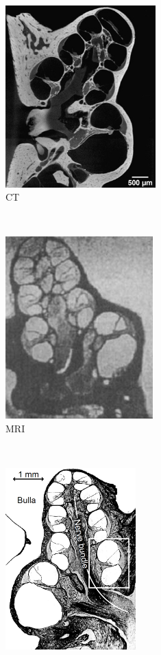 \begin{figure}[p]
	\centering
	
	\begin{subfigure}[t]{0.46\textwidth}
        \centering
        \includegraphics[height=7cm]{Methodology/ct_gp_poznyakovskiy}
        \caption{CT}
        \label{fig:ct_gp}
    \end{subfigure}%
    ~~~~
    \begin{subfigure}[t]{0.46\textwidth}
        \centering
        \includegraphics[height=7cm]{Methodology/mri_gp_thorne}
        \caption{MRI}
        \label{fig:mri_gp}
    \end{subfigure}\\%
    \vspace{1em}%
    \begin{subfigure}[t]{0.46\textwidth}
        \centering
        \includegraphics[height=7cm]{Methodology/histo_gp_briaire}

\end{subfigure}
\end{figure}
